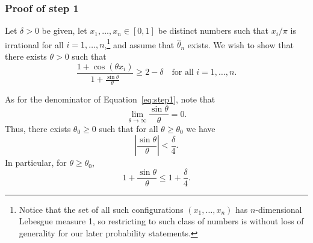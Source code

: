 \documentclass[11pt,twoside]{article}
\begin{document}
\subsubsection*{Proof of step 1}

Let \(\delta > 0\) be given, let \(x_1, \dots, x_n \in [0,1]\) be distinct numbers such that $x_i/\pi$ is irrational for all $i=1,\dots,n$,\footnote{Notice that the set of all such configurations $(x_1,\dots,x_n)$ has $n$-dimensional Lebesgue measure 1, so restricting to such class of numbers is without loss of generality for our later probability statements.} and assume that $\hat\theta_n$ exists. We wish to show that there exists \(\theta > 0\) such that
\begin{equation}\label{eq:step1}
\frac{1+\cos(\theta x_i)}{1+\frac{\sin\theta}{\theta}} \ge 2-\delta \quad \text{for all } i = 1,\dots, n.
\end{equation}

As for the denominator of Equation~\eqref{eq:step1}, note that
\[
\lim_{\theta \to \infty} \frac{\sin\theta}{\theta} = 0.
\]
Thus, there exists \(\theta_0 \geq 0\) such that for all \(\theta \ge \theta_0\) we have
\[
\left|\frac{\sin\theta}{\theta}\right| < \frac{\delta}{4}.
\]
In particular, for \(\theta \ge \theta_0\),
\[
1+\frac{\sin\theta}{\theta} \le 1+\frac{\delta}{4}.
\]
\end{document}
